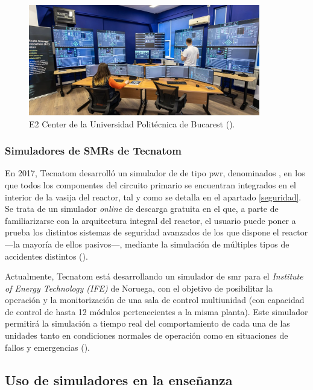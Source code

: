 \begin{figure}[h!]
  \centering
  \includegraphics[width=0.9\textwidth]{content/figures/e2_center_bucarest.png}
  \caption{E2 Center de la Universidad Politécnica de Bucarest (\cite{e2_center_romania}).}
  \label{fig:e2_center_bucarest}
\end{figure}

\subsubsection{Simuladores de SMRs de Tecnatom}

En 2017, Tecnatom desarrolló un simulador de  de tipo \acrshort{pwr}, denominados , en los que todos los componentes del circuito primario se encuentran integrados en el interior de la vasija del reactor, tal y como se detalla en el apartado \ref{seguridad}. Se trata de un simulador \textit{online} de descarga gratuita en el que, a parte de familiarizarse con la arquitectura integral del reactor, el usuario puede poner a prueba los distintos sistemas de seguridad avanzados de los que dispone el reactor ---la mayoría de ellos pasivos---, mediante la simulación de múltiples tipos de accidentes distintos (\cite{ipwr_iaea}).

Actualmente, Tecnatom está desarrollando un simulador de \acrshort{smr} para el \textit{Institute of Energy Technology (IFE)} de Noruega, con el objetivo de posibilitar la operación y la monitorización de una sala de control multiunidad (con capacidad de control de hasta 12 módulos pertenecientes a la misma planta). Este simulador permitirá la simulación a tiempo real del comportamiento de cada una de las unidades tanto en condiciones normales de operación como en situaciones de fallos y emergencias (\cite{tecnatom_smr_simulator}). 


\subsection{Uso de simuladores en la enseñanza}

